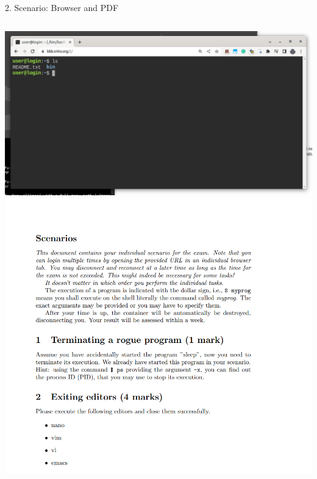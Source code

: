 \documentclass[compress,aspectratio=169]{beamer}
\begin{document}
\begin{frame}{2. Scenario: Browser and PDF}
\begin{columns}
\includegraphics[width=\textwidth]{exam-browser}
\includegraphics[width=\textwidth]{exam-pdf}
\end{columns}
\end{frame}
\end{document}

